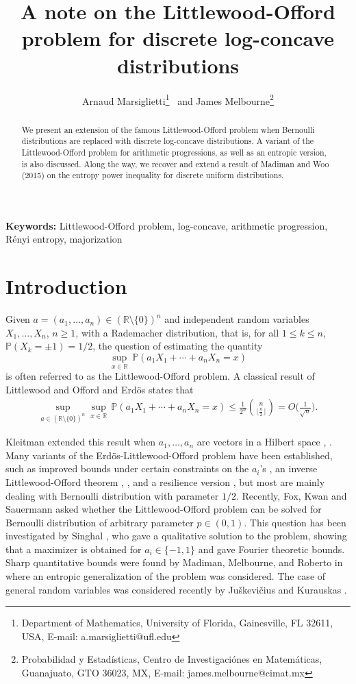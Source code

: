 \documentclass[11pt]{article}
\title{A note on the Littlewood-Offord problem for discrete log-concave distributions}
\author{Arnaud Marsiglietti\footnote{Department of Mathematics, University of Florida, Gainesville, FL 32611, USA, E-mail: a.marsiglietti@ufl.edu} \, and James Melbourne\footnote{Probabilidad y Estad\'isticas, Centro de Investigaci\'ones en Matem\'aticas, Guanajuato, GTO 36023, MX, E-mail: james.melbourne@cimat.mx}}
\date{}
\newcommand{\R}{\mathbb{R}}
\newcommand{\1}{[1]}
\newcommand{\Prob}{\mathbb{P}}
\begin{document}
\maketitle

\begin{abstract}

We present an extension of the famous Littlewood-Offord problem when Bernoulli distributions are replaced with discrete log-concave distributions. A variant of the Littlewood-Offord problem for arithmetic progressions, as well as an entropic version, is also discussed. Along the way, we recover and extend a result of Madiman and Woo (2015) on the entropy power inequality for discrete uniform distributions.

\end{abstract}

\vskip5mm
{\bf Keywords:} Littlewood-Offord problem, log-concave, arithmetic progression, R\'enyi entropy, majorization


\section{Introduction}

Given $a = (a_1, \dots, a_n) \in (\R \setminus \{0\})^n$ and independent random variables $X_1, \dots, X_n$, $n \geq 1$, with a Rademacher distribution, that is, for all $1 \leq k \leq n$, $\Prob(X_k= \pm 1) = 1/2$,
the question of estimating the quantity
$$ \sup_{x \in \R} \, \Prob(a_1 X_1 + \cdots + a_n X_n = x) $$
is often referred to as the Littlewood-Offord problem. A classical result of Littlewood and Offord \cite{LO} and Erd\"os \cite{E} states that
\begin{eqnarray}\label{erdos}
\sup_{a \in (\R \setminus \{0\})^n} \sup_{x \in \R} \, \Prob(a_1 X_1 + \cdots + a_n X_n = x) \leq \frac{1}{2^n}\binom{n}{\lfloor \frac{n}{2} \rfloor} = O \bigg( \frac{1}{\sqrt{n}} \bigg).
\end{eqnarray}

Kleitman extended this result when $a_1, \dots, a_n$ are vectors in a Hilbert space \cite{K1}, \cite{K2}. Many variants of the Erd\"os-Littlewood-Offord problem have been established, such as improved bounds under certain constraints on the $a_i$'s \cite{H}, an inverse Littlewood-Offord theorem \cite{TV}, \cite{NV}, and a resilience version \cite{BFK}, but most are mainly dealing with Bernoulli distribution with parameter $1/2$. Recently, Fox, Kwan and Sauermann \cite[Question 6.2]{FKS} asked whether the Littlewood-Offord problem can be solved for Bernoulli distribution of arbitrary parameter $p \in (0,1)$. This question has been investigated by Singhal \cite{S}, who gave a qualitative solution to the problem, showing that a maximizer is obtained for $a_i \in \{-1, 1\}$ and gave Fourier theoretic bounds. Sharp quantitative bounds were found by Madiman, Melbourne, and Roberto in \cite{MMR} where an entropic generalization of the problem was considered. The case of general random variables was considered recently by Juškevičius and Kurauskas \cite{JK}.
\end{document}
